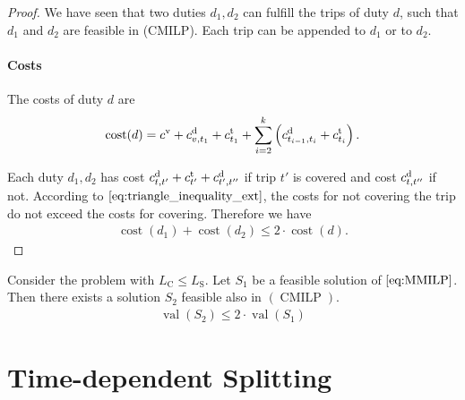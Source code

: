 \begin{proof}
We have seen that two duties $d_1,d_2$ can fulfill the trips of duty $d$, such that $d_1$ and $d_2$ are feasible in (CMILP). Each trip can be appended to $d_1$ or to $d_2$.

\paragraph{Costs} \proofparfill

The costs of duty $d$ are
\begin{align*}
	\operatorname{cost}(d)=c^{\operatorname{v}}+c^{\operatorname{d}}_{v,t_1}+c^{\operatorname{t}}_{t_1}+\sum_{i=2}^k \left(c^{\operatorname{d}}_{t_{i-1},t_i}+c^{\operatorname{t}}_{t_i}\right).
\end{align*}

Each duty $d_1,d_2$ has cost $c^{\operatorname{d}}_{t,t'}+c^{\operatorname{t}}_{t'}+c^{\operatorname{d}}_{t',t''}$ if trip $t'$ is covered and cost $c^{\operatorname{d}}_{t,t''}$ if not. According to $\eqref{eq:triangle_inequality_ext}$, the costs for not covering the trip do not exceed the costs for covering. Therefore we have
\begin{align*}
	\operatorname{cost}\left(d_1\right)+\operatorname{cost}\left(d_2\right)\leq 2\cdot\operatorname{cost}\left(d\right).
\end{align*}

\end{proof}

\begin{corollary}

Consider the problem with $L_{\operatorname{C}}\leq L_{\operatorname{S}}$. Let $S_1$ be a feasible solution of $\eqref{eq:MMILP}$. Then there exists a solution $S_2$ feasible also in $(\operatorname{CMILP})$.
\begin{align*}
	\operatorname{val}\left(S_2\right)\leq 2\cdot\operatorname{val}\left(S_1\right)
\end{align*}

\end{corollary}


\section{Time-dependent Splitting}
\label{sec:time_dependent_splitting}

